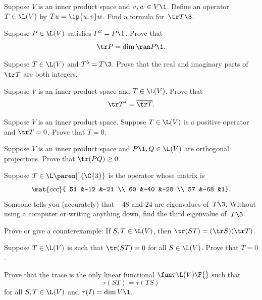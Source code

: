 
\exercise
Suppose $V$ is an inner product space and $v, w \in V\1$.  Define an operator
$T \in \L(V)$ by $Tu = \ip{u, v} w$.  Find a formula for~$\tr T\3$.


\exercise
Suppose $P \in \L(V)$ satisfies $P^2 = P\1$. Prove that
\[
\tr P = \dim \ran P\1.
\]
\exercisedisplayend


\exercise
Suppose $T \in \L(V)$ and $T^5 = T\3$. Prove that the real and imaginary parts of $\tr T$ are both integers.


\exercise
Suppose $V$ is an inner product space and $T \in \L(V)$. Prove that \label{393}
\[
\tr T^* = \overline{\tr T}.
\]
\exercisedisplayend


\exercise
Suppose $V$ is an inner product space.  Suppose $T \in \L(V)$ is a positive
operator and $\tr T = 0$. Prove that $T = 0$. \label{391}


\exercise
Suppose $V$ is an inner product space and $P\1, Q \in \L(V)$ are orthogonal projections. Prove that $\tr(PQ) \ge 0$.


\exercise
Suppose $T \in \L\paren[\big]{\C{3}}$ is the operator whose matrix is
\[
\mat{ccc}{
51 &-12 &-21 \\
60 &-40 &-28 \\
57 &-68 &1}.
\]
Someone tells you (accurately) that $-48$ and $24$ are eigenvalues of~$T\3$.
Without using a computer or writing anything down, find the third eigenvalue
of~$T\3$.


\exercise
Prove or give a counterexample: If $S, T \in \L(V)$, then
$
\tr (ST) = (\tr S) (\tr T)$.


\exercise
Suppose $T \in \L(V)$ is such that $\tr(ST) = 0$ for all $S \in \L(V)$. Prove that $T = 0$.


\exercise
Prove that the trace is the only linear functional $\fun \tau {\L(V)} {\F{}}$ such that\label{9trChar}
\[
\tau(ST) = \tau(TS)\]
for all $S, T \in \L(V)$ and $\tau(I) = \dim V\1$.


